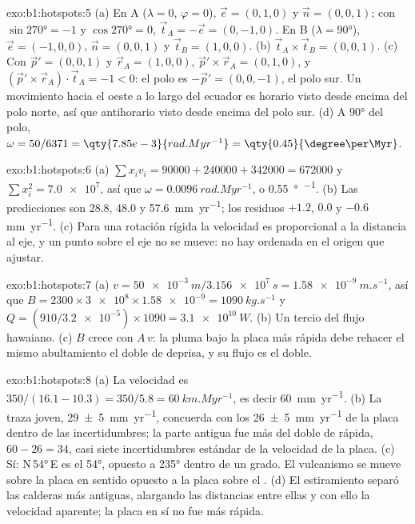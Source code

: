 \begin{solution}{exo:b1:hotspots:5}
(a) En A ($\lambda = 0$, $\varphi = 0$), $\vec e = (0, 1, 0)$ y
$\vec n = (0, 0, 1)$; con $\sin\ang{270} = -1$ y $\cos\ang{270} = 0$,
$\vec t_A = -\vec e = (0, -1, 0)$. En B ($\lambda = \ang{90}$),
$\vec e = (-1, 0, 0)$, $\vec n = (0, 0, 1)$ y $\vec t_B = (1, 0, 0)$.
(b) $\vec t_A\times\vec t_B = (0, 0, 1)$. (c) Con $\vec p' = (0, 0, 1)$ y
$\vec r_A = (1, 0, 0)$, $\vec p'\times\vec r_A = (0, 1, 0)$, y
$(\vec p'\times\vec r_A)\cdot\vec t_A = -1 < 0$: el polo es
$-\vec p' = (0, 0, -1)$, el polo sur. Un movimiento hacia el oeste a lo largo del ecuador
es horario visto desde encima del polo norte, así que antihorario visto desde encima del
polo sur. (d) A \ang{90} del polo, $\omega = 50/6371 =
\qty{7.85e-3}{rad.Myr^{-1}} = \qty{0.45}{\degree\per\Myr}$.
\end{solution}

\begin{solution}{exo:b1:hotspots:6}
(a) $\sum x_i v_i = 90000 + 240000 + 342000 = \num{672000}$ y
$\sum x_i^2 = \num{7.0e7}$, así que $\omega = \qty{0.0096}{rad.Myr^{-1}}$, o
\qty{0.55}{\degree\per\Myr}. (b) Las predicciones son 28.8, 48.0 y
\qty{57.6}{mm.yr^{-1}}; los residuos $+1.2$, $0.0$ y $-0.6$
\unit{mm.yr^{-1}}. (c) Para una rotación rígida la velocidad es proporcional a la
distancia al eje, y un punto sobre el eje no se mueve: no hay
ordenada en el origen que ajustar.
\end{solution}

\begin{solution}{exo:b1:hotspots:7}
(a) $v = \qty{50e-3}{m}/\qty{3.156e7}{s} = \qty{1.58e-9}{m.s^{-1}}$, así que
$B = 2300\times\num{3e8}\times\num{1.58e-9} = \qty{1090}{kg.s^{-1}}$ y
$Q = (910/\num{3.2e-5})\times1090 = \qty{3.1e10}{W}$. (b) Un tercio del
flujo hawaiano. (c) $B$ crece con $A\,v$: la pluma bajo la placa más rápida debe rehacer el mismo abultamiento el doble de deprisa, y su flujo es el doble.
\end{solution}

\begin{solution}{exo:b1:hotspots:8}
(a) La velocidad es $350/(16.1 - 10.3) = 350/5.8 = \qty{60}{km.Myr^{-1}}$, es decir
\qty{60}{mm.yr^{-1}}. (b) La traza joven, \qty{29 \pm 5}{mm.yr^{-1}}, concuerda
con los \qty{26 \pm 5}{mm.yr^{-1}} de la placa dentro de las incertidumbres; la
parte antigua fue más del doble de rápida, $60 - 26 = 34$, casi siete incertidumbres estándar
de la velocidad de la placa. (c) Sí: N\,\ang{54}\,E es el 
\ang{54}, opuesto a \ang{235} dentro de un grado. El vulcanismo se mueve sobre la
placa en sentido opuesto a la placa sobre el . (d) El estiramiento separó
las calderas más antiguas, alargando las distancias entre ellas y con ello la
velocidad aparente; la placa en sí no fue más rápida.
\end{solution}

